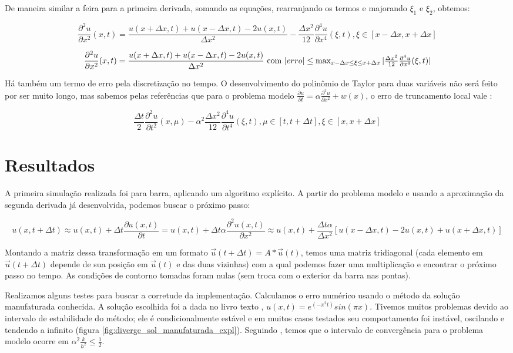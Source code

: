 \documentclass[12pt,fleqn]{article}
\begin{document}
De maneira similar a feira para a primeira derivada, somando as equações, rearranjando os termos e majorando $\xi_1$ e $\xi_2$, obtemos:

\[
\frac{\partial^2 u}{\partial x^2}(x, t) = \frac{u(x + \Delta x, t) + u(x - \Delta x, t) - 2 u(x, t)}{\Delta x^2} - \frac{\Delta x^2}{12} \frac{\partial^4 u}{\partial x^4} (\xi, t), \xi \in [x - \Delta x, x + \Delta x]
\]

\[
\frac{\partial^2 u}{\partial x^2}(x, t) = \frac{u(x + \Delta x, t) + u(x - \Delta x, t) - 2 u(x, t)}{\Delta x^2} $ com $ |erro| \leq \max_{x - \Delta x \leq \xi \leq x + \Delta x} |\frac{\Delta x^2}{12} \frac{\partial^4 u}{\partial x^4} (\xi, t)|
\]

Há também um termo de erro pela discretização no tempo. O desenvolvimento do polinômio de Taylor para duas variáveis não será feito por ser muito longo, mas sabemos pelas referências que para o problema modelo $\frac{\partial u}{\partial t} = \alpha \frac{\partial^2 u}{\partial x^2} + w(x)$, o erro de truncamento local vale \cite{livro}:

\[
\frac{\Delta t}{2}\frac{\partial^2 u}{\partial t^2}(x, \mu) - \alpha^2 \frac{\Delta x^2}{12}\frac{\partial^4 u}{\partial t^4}(\xi, t), \mu \in [t, t + \Delta t], \xi \in [x, x + \Delta x]
\]

\section{Resultados}

A primeira simulação realizada foi para barra, aplicando um algoritmo explícito. A partir do problema modelo e usando a aproximação da segunda derivada já desenvolvida, podemos buscar o próximo passo:

\[
u(x, t + \Delta t) \approx u(x, t) + \Delta t \frac{\partial u(x, t)}{\partial t} = u(x, t) + \Delta t \alpha \frac{\partial^2 u(x, t)}{\partial x^2} \approx u(x, t) + \frac{\Delta t \alpha}{\Delta x^2} [u(x - \Delta x, t) - 2 u(x, t) + u(x + \Delta x, t)]
\]

Montando a matriz dessa transformação em um formato $\vec u(t + \Delta t) = A * \vec u(t)$, temos uma matriz tridiagonal (cada elemento em $\vec u(t + \Delta t)$ depende de sua posição em $\vec u(t)$ e das duas vizinhas) com a qual podemos fazer uma multiplicação e encontrar o próximo passo no tempo. As condições de contorno tomadas foram nulas (sem troca com o exterior da barra nas pontas).

Realizamos alguns testes para buscar a corretude da implementação. Calculamos o erro numérico usando o método da solução manufaturada conhecida. A solução escolhida foi a dada no livro texto \cite{livro}, $u(x, t) = e^(-\pi^2 t)sin(\pi x)$. Tivemos muitos problemas devido ao intervalo de estabilidade do método; ele é condicionalmente estável e em muitos casos testados seu comportamento foi instável, oscilando e tendendo a infinito (figura \ref{fig:diverge_sol_manufaturada_expl}). Seguindo \cite{livro}, temos que o intervalo de convergência para o problema modelo ocorre em $\alpha^2 \frac{k}{h^2} \leq \frac{1}{2}$.
\end{document}

